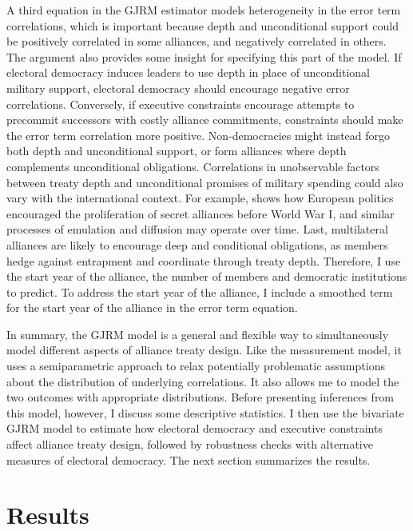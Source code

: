 \documentclass[12pt]{article}
\begin{document}
A third equation in the GJRM estimator models heterogeneity in the error term correlations, which is important because depth and unconditional support could be positively correlated in some alliances, and negatively correlated in others. 
The argument also provides some insight for specifying this part of the model.  
If electoral democracy induces leaders to use depth in place of unconditional military support, electoral democracy should encourage negative error correlations. 
Conversely, if executive constraints encourage attempts to precommit successors with costly alliance commitments, constraints should make the error term correlation more positive.
Non-democracies might instead forgo both depth and unconditional support, or form alliances where depth complements unconditional obligations. 
Correlations in unobservable factors between treaty depth and unconditional promises of military spending could also vary with the international context.
For example, \citet{Kuo2019} shows how European politics encouraged the proliferation of secret alliances before World War I, and similar processes of emulation and diffusion may operate over time.
Last, multilateral alliances are likely to encourage deep and conditional obligations, as members hedge against entrapment and coordinate through treaty depth. 
Therefore, I use the start year of the alliance, the number of members and democratic institutions to predict.
To address the start year of the alliance, I include a smoothed term for the start year of the alliance in the error term equation.  


In summary, the GJRM model is a general and flexible way to simultaneously model different aspects of alliance treaty design.
Like the measurement model, it uses a semiparametric approach to relax potentially problematic assumptions about the distribution of underlying correlations. 
It also allows me to model the two outcomes with appropriate distributions. 
Before presenting inferences from this model, however, I discuss some descriptive statistics. 
I then use the bivariate GJRM model to estimate how electoral democracy and executive constraints affect alliance treaty design, followed by robustness checks with alternative measures of electoral democracy. 
The next section summarizes the results. 


\section{Results}
\end{document}
